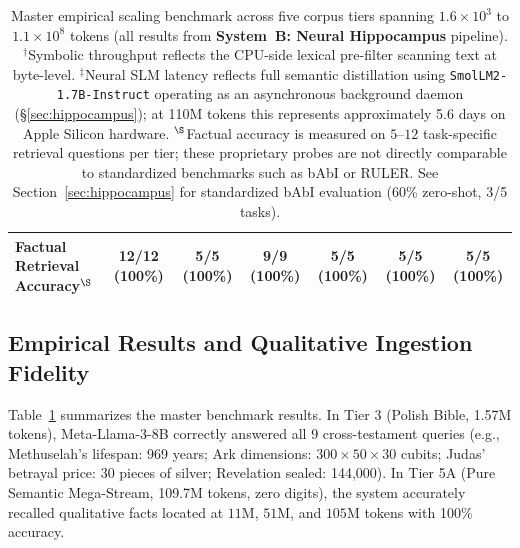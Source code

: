 \documentclass[11pt,a4paper]{article}
\begin{document}
\begin{table}[t]
{\begin{tabular}{lcccccc}
Factual Retrieval Accuracy$^\S$ & \textbf{12/12 (100\%)} & \textbf{5/5 (100\%)} & \textbf{9/9 (100\%)} & \textbf{5/5 (100\%)} & \textbf{5/5 (100\%)} & \textbf{5/5 (100\%)} \\
\bottomrule
\end{tabular}%
}
\caption{Master empirical scaling benchmark across five corpus tiers spanning $1.6\times 10^3$ to $1.1\times 10^8$ tokens (all results from \textbf{System~B: Neural Hippocampus} pipeline). $^{\dagger}$Symbolic throughput reflects the CPU-side lexical pre-filter scanning text at byte-level. $^{\ddagger}$Neural SLM latency reflects full semantic distillation using \texttt{SmolLM2\allowbreak-1.7B\allowbreak-Instruct} operating as an asynchronous background daemon (\S\ref{sec:hippocampus}); at 110M tokens this represents approximately 5.6 days on Apple Silicon hardware. $^{\S}$Factual accuracy is measured on $5$--$12$ task-specific retrieval questions per tier; these proprietary probes are not directly comparable to standardized benchmarks such as bAbI or RULER. See Section~\ref{sec:hippocampus} for standardized bAbI evaluation (60\% zero-shot, 3/5 tasks).}
\label{tab:master_benchmark}
\end{table}

\subsection{Empirical Results and Qualitative Ingestion Fidelity}
Table~\ref{tab:master_benchmark} summarizes the master benchmark results. In Tier 3 (Polish Bible, 1.57M tokens), Meta-Llama-3-8B correctly answered all 9 cross-testament queries (e.g., Methuselah's lifespan: 969 years; Ark dimensions: $300\times 50\times 30$ cubits; Judas' betrayal price: 30 pieces of silver; Revelation sealed: 144,000). In Tier 5A (Pure Semantic Mega-Stream, 109.7M tokens, zero digits), the system accurately recalled qualitative facts located at $11\text{M}$, $51\text{M}$, and $105\text{M}$ tokens with 100\% accuracy.
\end{document}
